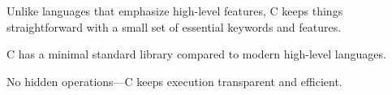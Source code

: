 
\begin{NxSSSBox}
	\begin{NxIDBox}
		Unlike languages that emphasize high-level features, C keeps things straightforward with a small set of essential keywords and features.
	\end{NxIDBox}
	\begin{NxIDBoxL}
		 C has a minimal standard library compared to modern high-level languages.
	\end{NxIDBoxL}
	\begin{NxIDBoxL}
		 No hidden operations—C keeps execution transparent and efficient.
	\end{NxIDBoxL}
\end{NxSSSBox}

